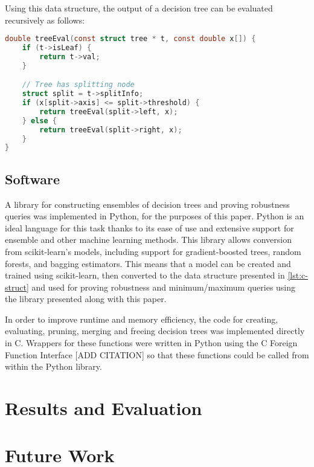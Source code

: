 \documentclass[pageno]{jpaper}
\begin{document}
\begin{doublespacing}
Using this data structure, the output of a decision tree can be evaluated recursively as follows:

{\singlespacing
\begin{lstlisting}[language=C, caption=decision tree evaluations]
double treeEval(const struct tree * t, const double x[]) {
    if (t->isLeaf) {
        return t->val;
    }

    // Tree has splitting node
    struct split = t->splitInfo;
    if (x[split->axis] <= split->threshold) {
        return treeEval(split->left, x);
    } else {
        return treeEval(split->right, x);
    }
}
\end{lstlisting}
}

\subsection{Software}
A library for constructing ensembles of decision trees and proving robustness queries was implemented in Python, for the purposes of this paper. Python is an ideal language for this task thanks to its ease of use and extensive support for ensemble and other machine learning methods. This library allows conversion from scikit-learn's models, including support for gradient-boosted trees, random forests, and bagging estimators. This means that a model can be created and trained using scikit-learn, then converted to the data structure presented in \autoref{lst:c-struct} and used for proving robustness and minimum/maximum queries using the library presented along with this paper.

In order to improve runtime and memory efficiency, the code for creating, evaluating, pruning, merging and freeing decision trees was implemented directly in C. Wrappers for these functions were written in Python using the C Foreign Function Interface [ADD CITATION] so that these functions could be called from within the Python library.

\section{Results and Evaluation}

\section{Future Work}


\end{doublespacing}
\end{document}
